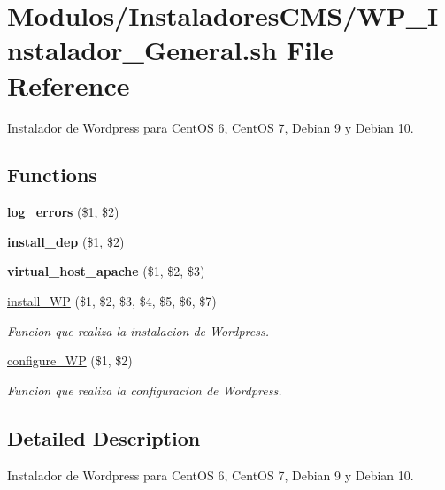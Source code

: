 \hypertarget{WP__Instalador__General_8sh}{}\section{Modulos/\+Instaladores\+C\+M\+S/\+W\+P\+\_\+\+Instalador\+\_\+\+General.sh File Reference}
\label{WP__Instalador__General_8sh}


Instalador de Wordpress para Cent\+OS 6, Cent\+OS 7, Debian 9 y Debian 10.  


\subsection*{Functions}
\begin{DoxyCompactItemize}
\item 
\mbox{\label{WP__Instalador__General_8sh_a92067b58a8478c9841b2cd9b75ea3565}} 
{\bfseries log\+\_\+errors} (\$1, \$2)
\item 
\mbox{\label{WP__Instalador__General_8sh_a7aff02becf631a8cd3f06f1fc2688670}} 
{\bfseries install\+\_\+dep} (\$1, \$2)
\item 
\mbox{\label{WP__Instalador__General_8sh_a2ea632f8e04de9564521b12cf10c47f4}} 
{\bfseries virtual\+\_\+host\+\_\+apache} (\$1, \$2, \$3)
\item 
\hyperlink{WP__Instalador__General_8sh_ab8bd4095cd5a5c54fa9256d3064f6d0f}{install\+\_\+\+WP} (\$1, \$2, \$3, \$4, \$5, \$6, \$7)
\begin{DoxyCompactList}\small\item\em Funcion que realiza la instalacion de Wordpress. \end{DoxyCompactList}\item 
\hyperlink{WP__Instalador__General_8sh_add91f549a7f408a6c51455ab9982ef5e}{configure\+\_\+\+WP} (\$1, \$2)
\begin{DoxyCompactList}\small\item\em Funcion que realiza la configuracion de Wordpress. \end{DoxyCompactList}\end{DoxyCompactItemize}


\subsection{Detailed Description}
Instalador de Wordpress para Cent\+OS 6, Cent\+OS 7, Debian 9 y Debian 10. 

